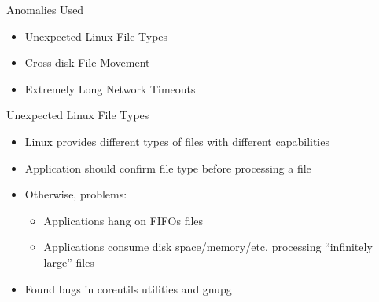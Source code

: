 \documentclass[pdf]{beamer}
\begin{document}
\begin{frame}{Anomalies Used}
  \begin{itemize}
    \item{Unexpected Linux File Types}
    \item{Cross-disk File Movement}
    \item{Extremely Long Network Timeouts}
  \end{itemize}
\end{frame}


\begin{frame}{Unexpected Linux File Types}
  \begin{itemize}
    \item{Linux provides different types of files with different capabilities}
    \item{Application should confirm file type before processing a file}
    \item{Otherwise, problems:}
      \begin{itemize}
        \item{Applications hang on FIFOs files}
        \item{Applications consume disk space/memory/etc. processing ``infinitely
          large'' files}
      \end{itemize}
    \item{Found bugs in coreutils utilities and gnupg}
  \end{itemize}
\end{frame}
\end{document}
